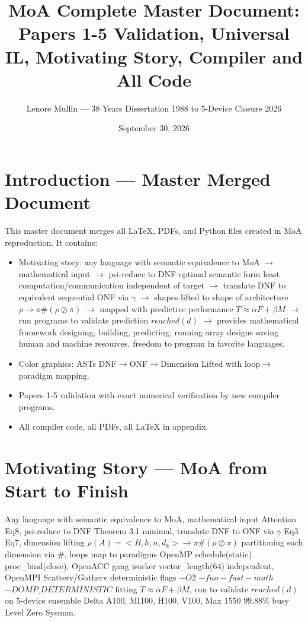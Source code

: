\documentclass[12pt,a4paper]{article}
\title{MoA Complete Master Document: Papers 1-5 Validation, Universal IL, Motivating Story, Compiler and All Code}
\author{Lenore Mullin — 38 Years Dissertation 1988 to 5-Device Closure 2026}
\date{September 30, 2026}
\begin{document}
\maketitle
\tableofcontents
\newpage

\section{Introduction — Master Merged Document}
This master document merges all LaTeX, PDFs, and Python files created in MoA reproduction. It contains:
\begin{itemize}
\item Motivating story: any language with semantic equivalence to MoA $\rightarrow$ mathematical input $\rightarrow$ psi-reduce to DNF optimal semantic form least computation/communication independent of target $\rightarrow$ translate DNF to equivalent sequential ONF via $\gamma$ $\rightarrow$ shapes lifted to shape of architecture $\rho\rightarrow\pi\#(\rho\oslash\pi)$ $\rightarrow$ mapped with predictive performance $T\approx\alpha F+\beta M$ $\rightarrow$ run programs to validate prediction $reached(d)$ $\rightarrow$ provides mathematical framework designing, building, predicting, running array designs saving human and machine resources, freedom to program in favorite languages.
\item Color graphics: ASTs DNF$\rightarrow$ONF$\rightarrow$Dimension Lifted with loop$\rightarrow$paradigm mapping.
\item Papers 1-5 validation with exact numerical verification by new compiler programs.
\item All compiler code, all PDFs, all LaTeX in appendix.
\end{itemize}

\section{Motivating Story — MoA from Start to Finish}
Any language with semantic equivalence to MoA, mathematical input Attention Eq8, psi-reduce to DNF Theorem 3.1 minimal, translate DNF to ONF via $\gamma$ Eq3 Eq7, dimension lifting $\rho(A)=<B,h,n,d_k>\rightarrow\pi\#(\rho\oslash\pi)$ partitioning each dimension via $\#$, loops map to paradigms OpenMP schedule(static) proc\_bind(close), OpenACC gang worker vector\_length(64) independent, OpenMPI Scatterv/Gatherv deterministic flags $-O2$ $-fno-fast-math$ $-DOMP\_DETERMINISTIC$ fitting $T\approx\alpha F+\beta M$, run to validate $reached(d)$ on 5-device ensemble Delta A100, MI100, H100, V100, Max 1550 $99.88\%$ busy Level Zero Sysman.
\end{document}
